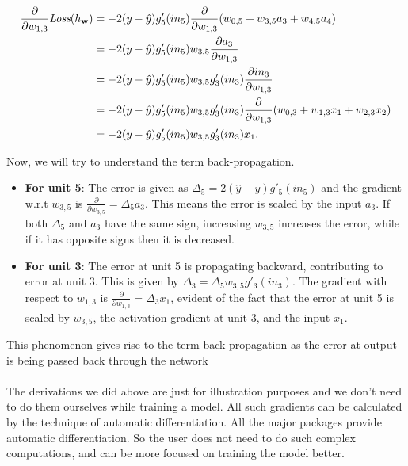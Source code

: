 \documentclass{article}
\begin{document}
    \begin{align*}
      \frac{\partial}{\partial w_{1,3}} \emph{Loss}(h_{\mathbf{w}}) &= -2 (y - \hat{y}) g_5'(in_5) \frac{\partial}{\partial w_{1,3}} (w_{0,5} + w_{3,5}a_3 + w_{4,5}a_4) \\
      &= -2 (y - \hat{y}) g_5'(in_5) w_{3,5} \frac{\partial a_3}{\partial w_{1,3}} \\
      &= -2 (y - \hat{y}) g_5'(in_5) w_{3,5} g_3'(in_3) \frac{\partial in_3}{\partial w_{1,3}} \\
      &= -2 (y - \hat{y}) g_5'(in_5) w_{3,5} g_3'(in_3) \frac{\partial}{\partial w_{1,3}} (w_{0,3} + w_{1,3}x_1 + w_{2,3}x_2) \\
      &= -2 (y - \hat{y}) g_5'(in_5) w_{3,5} g_3'(in_3) x_1.
    \end{align*}

    Now, we will try to understand the term back-propagation.

    \begin{itemize}
      \item \textbf{For unit 5}: The error is given as $\Delta_5 = 2(\hat{y} - y)g'_5(in_5)$ and the gradient w.r.t  $w_{3,5}$ is $\frac{\partial}{\partial w_{3,5}} = \Delta_5 a_3$. This means the error is scaled by the input $a_3$. If both $\Delta_5$ and $a_3$ have the same sign, increasing $w_{3,5}$ increases the error, while if it has opposite signs then it is decreased.
      \item \textbf{For unit 3}: The error at unit 5 is propagating backward, contributing to error at unit 3. This is given by $\Delta_3 = \Delta_5 w_{3,5} g'_3(in_3)$. The gradient with respect to $w_{1,3}$ is $\frac{\partial}{\partial w_{1,3}} = \Delta_3 x_1$, evident of the fact that the error at unit 5 is scaled by $w_{3,5}$, the activation gradient at unit 3, and the input $x_1$. 
    \end{itemize}

    This phenomenon gives rise to the term back-propagation as the error at output is being passed back through the network
    \paragraph{} The derivations we did above are just for illustration purposes and we don’t need to do them ourselves while training a model. All such gradients can be calculated by the technique of automatic differentiation. All the major packages provide automatic differentiation. So the user does not need to do such complex computations, and can be more focused on training the model better.  
\end{document}
